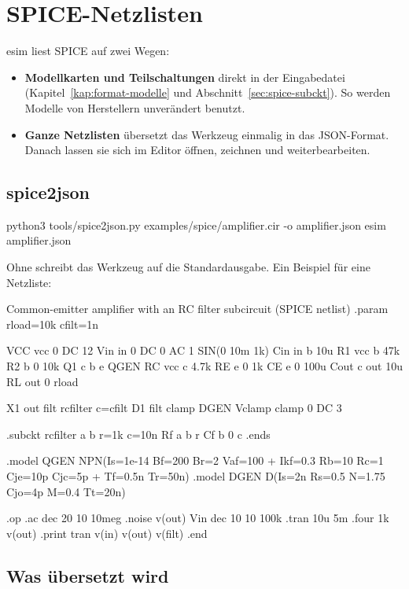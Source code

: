 \chapter{SPICE-Netzlisten}
\label{kap:spice}

esim liest SPICE auf zwei Wegen:

\begin{itemize}
  \item \textbf{Modellkarten und Teilschaltungen} direkt in der
    Eingabedatei (Kapitel~\ref{kap:format-modelle} und
    Abschnitt~\ref{sec:spice-subckt}). So werden Modelle von Herstellern
    unverändert benutzt.
  \item \textbf{Ganze Netzlisten} übersetzt das Werkzeug
     einmalig in das JSON-Format. Danach lassen
    sie sich im Editor öffnen, zeichnen und weiterbearbeiten.
\end{itemize}

\section{spice2json}

\begin{shell}
python3 tools/spice2json.py examples/spice/amplifier.cir -o amplifier.json
esim amplifier.json
\end{shell}

Ohne  schreibt das Werkzeug auf die Standardausgabe. Ein Beispiel
für eine Netzliste:

\begin{spicecode}
Common-emitter amplifier with an RC filter subcircuit (SPICE netlist)
.param rload=10k cfilt=1n

VCC vcc 0 DC 12
Vin in 0 DC 0 AC 1 SIN(0 10m 1k)
Cin in b 10u
R1 vcc b 47k
R2 b 0 10k
Q1 c b e QGEN
RC vcc c 4.7k
RE e 0 1k
CE e 0 100u
Cout c out 10u
RL out 0 {rload}

X1 out filt rcfilter c={cfilt}
D1 filt clamp DGEN
Vclamp clamp 0 DC 3

.subckt rcfilter a b r=1k c=10n
Rf a b {r}
Cf b 0 {c}
.ends

.model QGEN NPN(Is=1e-14 Bf=200 Br=2 Vaf=100
+ Ikf=0.3 Rb=10 Rc=1 Cje=10p Cjc=5p
+ Tf=0.5n Tr=50n)
.model DGEN D(Is=2n Rs=0.5 N=1.75 Cjo=4p M=0.4 Tt=20n)

.op
.ac dec 20 10 10meg
.noise v(out) Vin dec 10 10 100k
.tran 10u 5m
.four 1k v(out)
.print tran v(in) v(out) v(filt)
.end
\end{spicecode}

\section{Was übersetzt wird}

